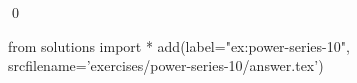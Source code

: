 
    \begin{ex}
  \label{ex:power-series-10}
  
  \qed
\end{ex}
\begin{python0}
from solutions import *
add(label="ex:power-series-10",
    srcfilename='exercises/power-series-10/answer.tex') 
\end{python0}                              
